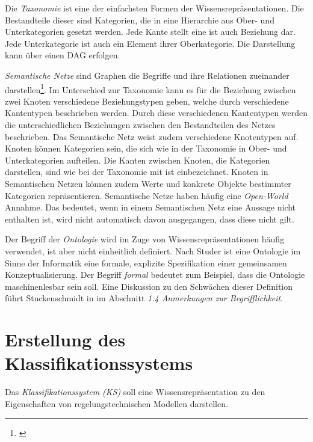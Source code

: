 Die \textit{Taxonomie} ist eine der einfachsten Formen der Wissensrepräsentationen. Die Bestandteile dieser sind Kategorien, die in eine Hierarchie aus Ober- und Unterkategorien gesetzt werden. Jede Kante stellt eine \glqq ist auch \grqq Beziehung dar. Jede Unterkategorie ist auch ein Element ihrer Oberkategorie. Die Darstellung kann über einen DAG erfolgen.

\textit{Semantische Netze} \glqq sind Graphen die Begriffe und ihre Relationen zueinander darstellen\grqq\footnote{\cite[S.28]{STU09}}. Im Unterschied zur Taxonomie kann es für die Beziehung zwischen zwei Knoten verschiedene Beziehungstypen geben, welche durch verschiedene Kantentypen beschrieben werden. Durch diese verschiedenen Kantentypen werden die unterschiedlichen Beziehungen zwischen den Bestandteilen des Netzes beschrieben. Das Semantische Netz weist zudem verschiedene Knotentypen auf. Knoten können Kategorien sein, die sich wie in der Taxonomie in Ober- und Unterkategorien aufteilen. Die Kanten zwischen Knoten, die Kategorien darstellen, sind wie bei der Taxonomie mit \glqq ist ein\grqq bezeichnet. Knoten in Semantischen Netzen können zudem Werte und konkrete Objekte bestimmter Kategorien repräsentieren.
Semantische Netze haben häufig eine \textit{Open-World} Annahme. Das bedeutet, wenn in einem Semantischen Netz eine Aussage nicht enthalten ist, wird nicht automatisch davon ausgegangen, dass diese nicht gilt.

Der Begriff der \textit{Ontologie} wird im Zuge von Wissensrepräsentationen häufig verwendet, ist aber nicht einheitlich definiert. Nach Studer \cite{STBEFE98} ist eine Ontologie im Sinne der Informatik eine \glqq formale, explizite Spezifikation einer gemeinsamen Konzeptualisierung\grqq. Der Begriff \textit{formal} bedeutet zum Beispiel, dass die Ontologie maschinenlesbar sein soll. Eine Diskussion zu den Schwächen dieser Definition führt Stuckenschmidt in \cite{STU09} im Abschnitt \textit{1.4 Anmerkungen zur Begrifflichkeit}. 

\section{Erstellung des Klassifikationssystems}
\label{Ch:Vorbetrachtung:Sec:KS}
Das \textit{Klassifikationssystem (KS)} soll eine Wissensrepräsentation zu den Eigenschaften von regelungstechnischen Modellen darstellen. 

